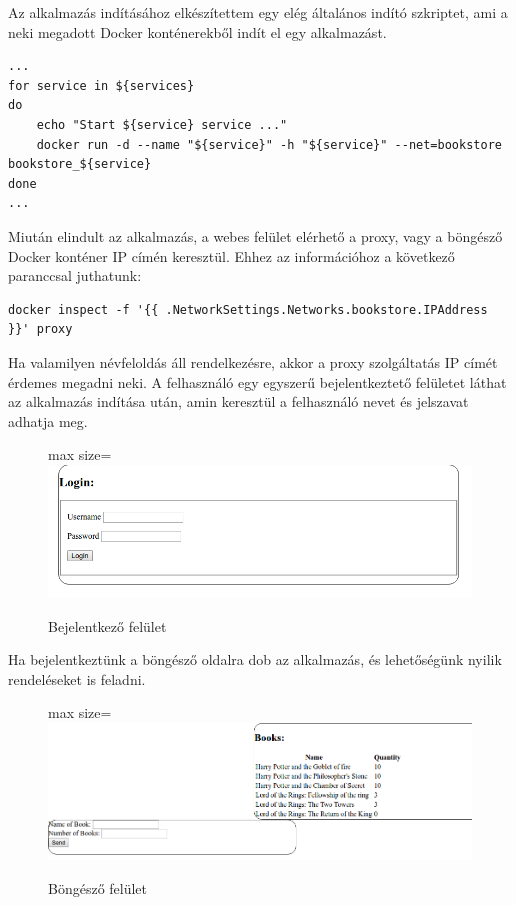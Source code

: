 \documentclass[11pt,magyar,a4paper,twoside,]{report}
\let\Oldincludegraphics\includegraphics
\renewcommand{\includegraphics}[1]{
\begin{adjustbox}{max size={\textwidth}{\textheight}}
    \Oldincludegraphics[scale=0.6]{#1}%
\end{adjustbox}
}
\begin{document}
Az alkalmazás indításához elkészítettem egy elég általános indító
szkriptet, ami a neki megadott Docker konténerekből indít el egy
alkalmazást.

\begin{verbatim}
...
for service in ${services}
do
    echo "Start ${service} service ..."
    docker run -d --name "${service}" -h "${service}" --net=bookstore bookstore_${service}
done
...
\end{verbatim}

Miután elindult az alkalmazás, a webes felület elérhető a proxy, vagy a
böngésző Docker konténer IP címén keresztül. Ehhez az információhoz a
következő paranccsal juthatunk:

\begin{verbatim}
docker inspect -f '{{ .NetworkSettings.Networks.bookstore.IPAddress }}' proxy
\end{verbatim}

Ha valamilyen névfeloldás áll rendelkezésre, akkor a proxy szolgáltatás
IP címét érdemes megadni neki. A felhasználó egy egyszerű
bejelentkeztető felületet láthat az alkalmazás indítása után, amin
keresztül a felhasználó nevet és jelszavat adhatja meg.

\begin{figure}[H]
\centering
\includegraphics{img/loginscreen.png}
\caption{Bejelentkező felület}
\end{figure}

Ha bejelentkeztünk a böngésző oldalra dob az alkalmazás, és lehetőségünk
nyilik rendeléseket is feladni.

\begin{figure}[H]
\centering
\includegraphics{img/browsescreen.png}
\caption{Böngésző felület}
\end{figure}
\end{document}
